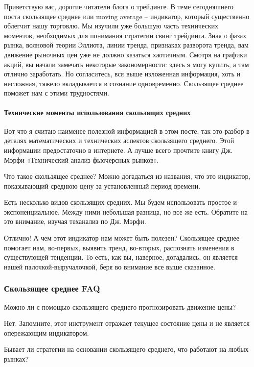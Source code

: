 \documentclass{book}
\begin{document}
Приветствую вас, дорогие читатели блога о трейдинге. В теме
сегодняшнего поста скользящее среднее или moving average – индикатор,
который существенно облегчит нашу торговлю. Мы изучили уже большую
часть технических моментов, необходимых для понимания стратегии свинг
трейдинга. Зная о фазах рынка, волновой теории Эллиота, линии тренда,
признаках разворота тренда, вам движение рыночных цен уже не должно
казаться хаотичным. Смотря на графики акций, вы начали замечать
некоторые закономерности: здесь я могу купить, а там отлично
заработать. Но согласитесь, вся выше изложенная информация, хоть и
несложная, тяжело вкладывается в сознание одновременно. Скользящее
среднее поможет нам с этими трудностями.

\paragraph{Технические моменты использования скользящих средних}

Вот что я считаю наименее полезной информацией в этом посте, так это разбор в деталях математических и технических аспектов скользящего среднего. Этой информации предостаточно в интернете. А лучше всего прочтите книгу Дж. Мэрфи «Технический анализ фьючерсных рынков».

Что такое скользящее среднее? Можно догадаться из названия, что это индикатор, показывающий среднюю цену за установленный период времени.

Есть несколько видов скользящих средних. Мы будем использовать простое и экспоненциальное. Между ними небольшая разница, но все же есть. Обратите на это внимание, изучая теханализ по Дж. Мэрфи.

Отлично! А чем этот индикатор нам может быть полезен? Скользящее
среднее помогает нам, во-первых, выявить тренд, во-вторых, распознать
изменения в существующей тенденции. То есть, как вы, наверное,
догадались, он является нашей палочкой-выручалочкой, беря во внимание
все выше сказанное.

\subsubsection{Скользящее среднее FAQ}

Можно ли с помощью скользящего среднего прогнозировать движение цены?

Нет. Запомните, этот инструмент отражает текущее состояние цены и не является опережающим индикатором.

Бывает ли стратегии на основании скользящего среднего, что работают на любых рынках?
\end{document}
